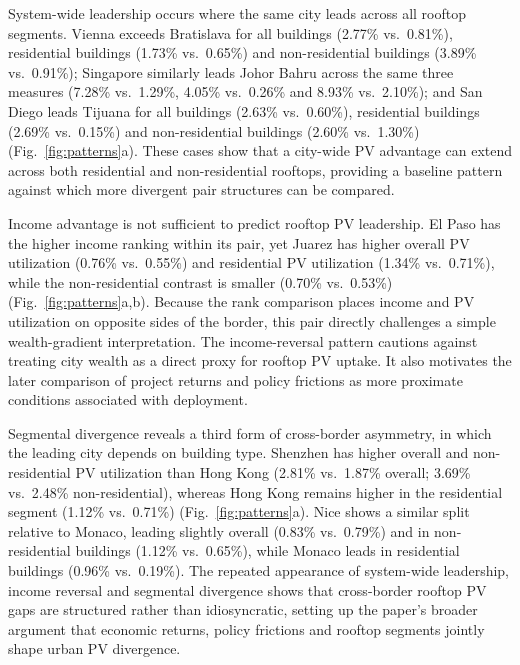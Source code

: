 \documentclass[pdflatex,sn-nature]{sn-jnl}
\begin{document}
System-wide leadership occurs where the same city leads across all rooftop segments. Vienna exceeds Bratislava for all buildings (2.77\% vs.\ 0.81\%), residential buildings (1.73\% vs.\ 0.65\%) and non-residential buildings (3.89\% vs.\ 0.91\%); Singapore similarly leads Johor Bahru across the same three measures (7.28\% vs.\ 1.29\%, 4.05\% vs.\ 0.26\% and 8.93\% vs.\ 2.10\%); and San Diego leads Tijuana for all buildings (2.63\% vs.\ 0.60\%), residential buildings (2.69\% vs.\ 0.15\%) and non-residential buildings (2.60\% vs.\ 1.30\%) (Fig.~\ref{fig:patterns}a). These cases show that a city-wide PV advantage can extend across both residential and non-residential rooftops, providing a baseline pattern against which more divergent pair structures can be compared.

Income advantage is not sufficient to predict rooftop PV leadership. El Paso has the higher income ranking within its pair, yet Juarez has higher overall PV utilization (0.76\% vs.\ 0.55\%) and residential PV utilization (1.34\% vs.\ 0.71\%), while the non-residential contrast is smaller (0.70\% vs.\ 0.53\%) (Fig.~\ref{fig:patterns}a,b). Because the rank comparison places income and PV utilization on opposite sides of the border, this pair directly challenges a simple wealth-gradient interpretation. The income-reversal pattern cautions against treating city wealth as a direct proxy for rooftop PV uptake. It also motivates the later comparison of project returns and policy frictions as more proximate conditions associated with deployment.

Segmental divergence reveals a third form of cross-border asymmetry, in which the leading city depends on building type. Shenzhen has higher overall and non-residential PV utilization than Hong Kong (2.81\% vs.\ 1.87\% overall; 3.69\% vs.\ 2.48\% non-residential), whereas Hong Kong remains higher in the residential segment (1.12\% vs.\ 0.71\%) (Fig.~\ref{fig:patterns}a). Nice shows a similar split relative to Monaco, leading slightly overall (0.83\% vs.\ 0.79\%) and in non-residential buildings (1.12\% vs.\ 0.65\%), while Monaco leads in residential buildings (0.96\% vs.\ 0.19\%). The repeated appearance of system-wide leadership, income reversal and segmental divergence shows that cross-border rooftop PV gaps are structured rather than idiosyncratic, setting up the paper's broader argument that economic returns, policy frictions and rooftop segments jointly shape urban PV divergence.
\end{document}
